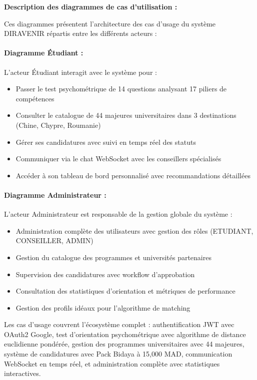 \documentclass[12pt,a4paper]{report}
\begin{document}
\textbf{Description des diagrammes de cas d'utilisation :}

Ces diagrammes présentent l'architecture des cas d'usage du système DIRAVENIR répartis entre les différents acteurs :

\paragraph{Diagramme Étudiant :}
L'acteur Étudiant interagit avec le système pour :
\begin{itemize}
    \item Passer le test psychométrique de 14 questions analysant 17 piliers de compétences
    \item Consulter le catalogue de 44 majeures universitaires dans 3 destinations (Chine, Chypre, Roumanie)
    \item Gérer ses candidatures avec suivi en temps réel des statuts
    \item Communiquer via le chat WebSocket avec les conseillers spécialisés
    \item Accéder à son tableau de bord personnalisé avec recommandations détaillées
\end{itemize}

\paragraph{Diagramme Administrateur :}
L'acteur Administrateur est responsable de la gestion globale du système :
\begin{itemize}
    \item Administration complète des utilisateurs avec gestion des rôles (ETUDIANT, CONSEILLER, ADMIN)
    \item Gestion du catalogue des programmes et universités partenaires
    \item Supervision des candidatures avec workflow d'approbation
    \item Consultation des statistiques d'orientation et métriques de performance
    \item Gestion des profils idéaux pour l'algorithme de matching
\end{itemize}
    
Les cas d'usage couvrent l'écosystème complet : authentification JWT avec OAuth2 Google, test d'orientation psychométrique avec algorithme de distance euclidienne pondérée, gestion des programmes universitaires avec 44 majeures, système de candidatures avec Pack Bidaya à 15,000 MAD, communication WebSocket en temps réel, et administration complète avec statistiques interactives.
\end{document}
